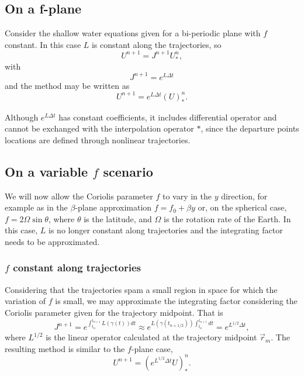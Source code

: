 \documentclass[10pt,a4paper]{article}
\begin{document}
\subsection{On a f-plane} 

Consider the shallow water equations given for a bi-periodic plane with $f$ constant. In this case $L$ is constant along the trajectories, so
\begin{equation}
U^{n+1}=J^{n+1}U^{n}_{*},
\end{equation}
with
\begin{equation}
 J^{n+1}=e^{L\Delta t}
\end{equation}
and the method may be written as
\begin{equation}
U^{n+1}=e^{L\Delta t}(U)^{n}_{*}.
\end{equation}

Although $e^{L\Delta t}$ has constant coefficients, it includes differential operator and cannot be exchanged with the interpolation operator $*$, since the departure points locations are defined through nonlinear trajectories. 

\subsection{On a variable $f$ scenario}

We will now allow the Coriolis parameter $f$ to vary in the $y$ direction, for example as in the $\beta$-plane approximation $f=f_0+\beta y$ or, on the spherical case, $f=2\Omega \sin \theta$, where $\theta$ is the latitude, and $\Omega$ is the rotation rate of the Earth. In this case, $L$ is no longer constant along trajectories and the integrating factor needs to be approximated. 

\subsubsection{$f$ constant along trajectories}

Considering that the trajectories spam a small region in space for which the variation of $f$ is small, we may approximate the integrating factor considering the Coriolis parameter given for the trajectory midpoint. That is
\begin{equation}
J^{n+1}=e^{\int_{t_n}^{t_{n+1}}L(\gamma(t))dt}  \approx e^{L(\gamma(t_{n+1/2})) \int_{t_n}^{t_{n+1}}dt} = e^{L^{1/2}\Delta t},
\end{equation}
 where $L^{1/2}$ is the linear operator calculated at the trajectory midpoint $\vec{r}_m$. The resulting method is similar to the $f$-plane case,
\begin{equation}
U^{n+1}=(e^{L^{1/2}\Delta t} U)^{n}_{*}.
\end{equation}
 
\end{document}
